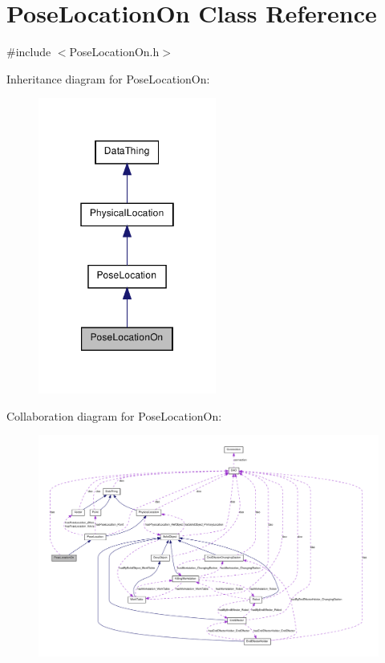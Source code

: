 \hypertarget{class_pose_location_on}{
\section{PoseLocationOn Class Reference}
\label{class_pose_location_on}
}


{\ttfamily \#include $<$PoseLocationOn.h$>$}



Inheritance diagram for PoseLocationOn:\nopagebreak
\begin{figure}[H]
\begin{center}
\leavevmode
\includegraphics[width=166pt]{class_pose_location_on__inherit__graph}
\end{center}
\end{figure}


Collaboration diagram for PoseLocationOn:\nopagebreak
\begin{figure}[H]
\begin{center}
\leavevmode
\includegraphics[width=400pt]{class_pose_location_on__coll__graph}
\end{center}
\end{figure}
